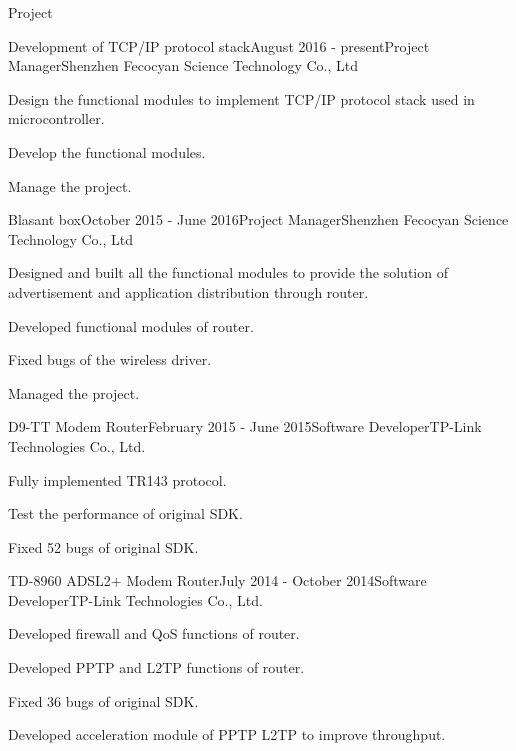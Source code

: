 \documentclass{resume} %
\begin{document}
\begin{rSection}{Project}
	
\begin{rSubsection}{Development of TCP/IP protocol stack}{August 2016 - present}{Project Manager}{Shenzhen Fecocyan Science Technology Co., Ltd}
	\item Design the functional modules to implement TCP/IP protocol stack used in microcontroller.
	\item Develop the functional modules.
	\item Manage the project.
\end{rSubsection}


\begin{rSubsection}{Blasant box}{October 2015 - June 2016}{Project Manager}{Shenzhen Fecocyan Science Technology Co., Ltd}
	\item Designed and built all the functional modules to provide the solution of advertisement and application distribution through router.
	\item Developed functional modules of router.
	\item Fixed bugs of the wireless driver.
	\item Managed the project.
\end{rSubsection}


\begin{rSubsection}{D9-TT Modem Router}{February 2015 - June 2015}{Software Developer}{TP-Link Technologies Co., Ltd.}
	\item Fully implemented TR143 protocol.
	\item Test the performance of original SDK.
	\item Fixed 52 bugs of original SDK.
\end{rSubsection}


\begin{rSubsection}{TD-8960 ADSL2+ Modem Router}{July 2014 - October 2014}{Software Developer}{TP-Link Technologies Co., Ltd.}
	\item Developed firewall and QoS functions of router.
	\item Developed PPTP and L2TP functions of router.
	\item Fixed 36 bugs of original SDK.
	\item Developed acceleration module of PPTP L2TP to improve throughput.
\end{rSubsection}


\end{rSection}
\end{document}
